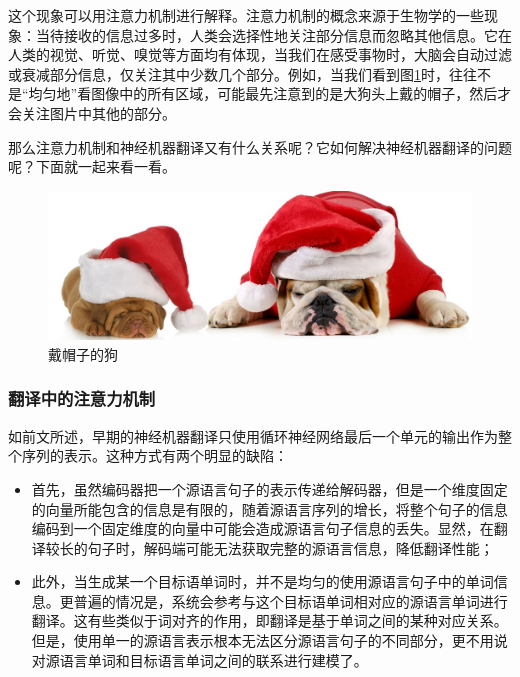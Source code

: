 \parinterval 这个现象可以用注意力机制进行解释。注意力机制的概念来源于生物学的一些现象：当待接收的信息过多时，人类会选择性地关注部分信息而忽略其他信息。它在人类的视觉、听觉、嗅觉等方面均有体现，当我们在感受事物时，大脑会自动过滤或衰减部分信息，仅关注其中少数几个部分。例如，当我们看到图\ref{fig:6-20}时，往往不是``均匀地''看图像中的所有区域，可能最先注意到的是大狗头上戴的帽子，然后才会关注图片中其他的部分。

\parinterval 那么注意力机制和神经机器翻译又有什么关系呢？它如何解决神经机器翻译的问题呢？下面就一起来看一看。

\begin{figure}[htp]
\centering
\includegraphics[scale=0.2]{./Chapter6/Figures/dog-hat.jpg}
\caption{戴帽子的狗}
\label{fig:6-20}
\end{figure}


\subsubsection{翻译中的注意力机制}

\parinterval 如前文所述，早期的神经机器翻译只使用循环神经网络最后一个单元的输出作为整个序列的表示。这种方式有两个明显的缺陷：

\begin{itemize}
\vspace{0.5em}
\item 首先，虽然编码器把一个源语言句子的表示传递给解码器，但是一个维度固定的向量所能包含的信息是有限的，随着源语言序列的增长，将整个句子的信息编码到一个固定维度的向量中可能会造成源语言句子信息的丢失。显然，在翻译较长的句子时，解码端可能无法获取完整的源语言信息，降低翻译性能；
\vspace{0.5em}
\item 此外，当生成某一个目标语单词时，并不是均匀的使用源语言句子中的单词信息。更普遍的情况是，系统会参考与这个目标语单词相对应的源语言单词进行翻译。这有些类似于词对齐的作用，即翻译是基于单词之间的某种对应关系。但是，使用单一的源语言表示根本无法区分源语言句子的不同部分，更不用说对源语言单词和目标语言单词之间的联系进行建模了。
\vspace{0.5em}
\end{itemize}

